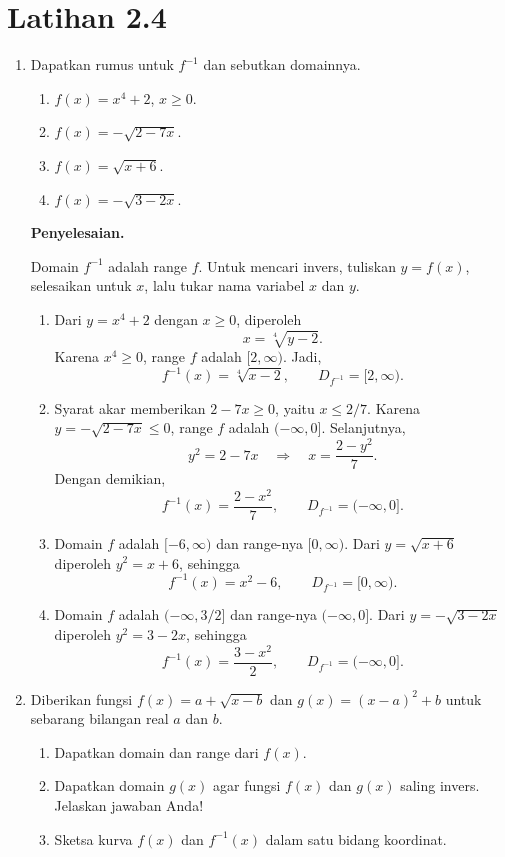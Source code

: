 \documentclass[11pt,a4paper]{article}
\newcommand{\jawab}{\par\medskip\textbf{Penyelesaian.}\par}
\begin{document}
\section*{Latihan 2.4}
\begin{enumerate}
    \item[5.] Dapatkan rumus untuk $f^{-1}$ dan sebutkan domainnya.
\begin{enumerate}
    \item $f(x)=x^4+2$, $x\geq 0$.
    \item $f(x)=-\sqrt{2-7x}$.
    \item $f(x)=\sqrt{x+6}$.
    \item $f(x)=-\sqrt{3-2x}$.
\end{enumerate}
\jawab
Domain $f^{-1}$ adalah range $f$. Untuk mencari invers, tuliskan $y=f(x)$,
selesaikan untuk $x$, lalu tukar nama variabel $x$ dan $y$.
\begin{enumerate}
    \item Dari $y=x^4+2$ dengan $x\geq 0$, diperoleh
    \[
        x=\sqrt[4]{y-2}.
    \]
    Karena $x^4\geq 0$, range $f$ adalah $[2,\infty)$. Jadi,
    \[
        \boxed{f^{-1}(x)=\sqrt[4]{x-2},\qquad D_{f^{-1}}=[2,\infty).}
    \]

    \item Syarat akar memberikan $2-7x\geq 0$, yaitu $x\leq 2/7$.
    Karena $y=-\sqrt{2-7x}\leq 0$, range $f$ adalah $(-\infty,0]$.
    Selanjutnya,
    \[
        y^2=2-7x\quad\Longrightarrow\quad x=\frac{2-y^2}{7}.
    \]
    Dengan demikian,
    \[
        \boxed{f^{-1}(x)=\frac{2-x^2}{7},\qquad D_{f^{-1}}=(-\infty,0].}
    \]

    \item Domain $f$ adalah $[-6,\infty)$ dan range-nya $[0,\infty)$.
    Dari $y=\sqrt{x+6}$ diperoleh $y^2=x+6$, sehingga
    \[
        \boxed{f^{-1}(x)=x^2-6,\qquad D_{f^{-1}}=[0,\infty).}
    \]

    \item Domain $f$ adalah $(-\infty,3/2]$ dan range-nya $(-\infty,0]$.
    Dari $y=-\sqrt{3-2x}$ diperoleh $y^2=3-2x$, sehingga
    \[
        \boxed{f^{-1}(x)=\frac{3-x^2}{2},\qquad D_{f^{-1}}=(-\infty,0].}
    \]
\end{enumerate}
\item[9.] Diberikan fungsi $f(x)=a+\sqrt{x-b}$ dan $g(x)=(x-a)^2+b$ untuk sebarang
bilangan real $a$ dan $b$.
\begin{enumerate}
    \item Dapatkan domain dan range dari $f(x)$.
    \item Dapatkan domain $g(x)$ agar fungsi $f(x)$ dan $g(x)$ saling invers.
    Jelaskan jawaban Anda!
    \item Sketsa kurva $f(x)$ dan $f^{-1}(x)$ dalam satu bidang koordinat.
\end{enumerate}


\end{enumerate}
\end{document}
